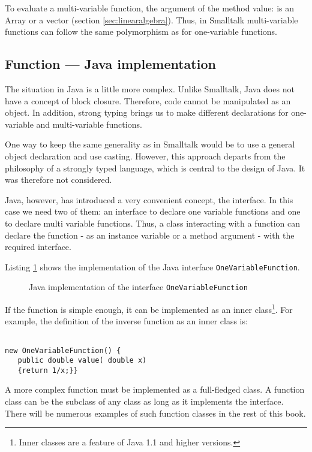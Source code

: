 \documentclass[twoside]{book}
\begin{document}
To evaluate a multi-variable function, the argument of the method
value: is an Array or a vector (\cf section
\ref{sec:linearalgebra}). Thus, in Smalltalk multi-variable
functions can follow the same polymorphism as for one-variable
functions.

\subsection{Function --- Java implementation}
\label{sec:jvFunction} The situation in Java is
a little more complex. Unlike Smalltalk, Java does not have a
concept of block closure. Therefore, code cannot be manipulated as
an object. In addition, strong typing brings us to make different
declarations for one-variable and multi-variable functions.

One way to keep the same generality as in Smalltalk would be to
use a general object declaration and use casting. However, this
approach departs from the philosophy of a strongly typed language,
which is central to the design of Java. It was therefore not
considered.

Java, however, has introduced a very convenient concept, the
interface. In this case we need two of them: an interface to
declare one variable functions and one to declare multi variable
functions. Thus, a class interacting with a function can declare
the function - as an instance variable or a method argument - with
the required interface.

Listing \ref{lj:function} shows the implementation of the Java
interface {\tt OneVariableFunction}.
\begin{figure}
\begin{listing}
\caption{Java implementation of the interface {\tt OneVariableFunction}}
\label{lj:function}

\end{listing}
\end{figure}
If the function is simple enough, it can be implemented as an
inner class\footnote{Inner classes are a feature of Java 1.1 and
higher versions.}. For example, the definition of the inverse
function as an inner class is:
\begin{codeExample}
\begin{verbatim}

new OneVariableFunction() {
   public double value( double x)
   {return 1/x;}}
\end{verbatim}
\end{codeExample}
A more complex function must be implemented as a full-fledged
class. A function class can be the subclass of any class as long
as it implements the interface. There will be numerous examples of
such function classes in the rest of this book.
\end{document}
